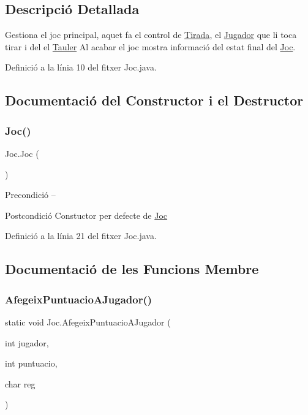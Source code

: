 \subsection{Descripció Detallada}
Gestiona el joc principal, aquet fa el control de \mbox{\hyperlink{class_tirada}{Tirada}}, el \mbox{\hyperlink{class_jugador}{Jugador}} que li toca tirar i del el \mbox{\hyperlink{class_tauler}{Tauler}} Al acabar el joc mostra informació del estat final del \mbox{\hyperlink{class_joc}{Joc}}. 

Definició a la línia 10 del fitxer Joc.\+java.



\subsection{Documentació del Constructor i el Destructor}
\mbox{\label{class_joc_a22b2f8a3a689e97aa5245060187504e7}} 
\subsubsection{\texorpdfstring{Joc()}{Joc()}}
{\footnotesize\ttfamily Joc.\+Joc (\begin{DoxyParamCaption}{ }\end{DoxyParamCaption})}

\begin{DoxyPrecond}{Precondició}
-- 
\end{DoxyPrecond}
\begin{DoxyPostcond}{Postcondició}
Constuctor per defecte de \mbox{\hyperlink{class_joc}{Joc}} 
\end{DoxyPostcond}


Definició a la línia 21 del fitxer Joc.\+java.



\subsection{Documentació de les Funcions Membre}
\mbox{\label{class_joc_ae969b3e16360a36ada26dffbb184fc33}} 
\subsubsection{\texorpdfstring{Afegeix\+Puntuacio\+A\+Jugador()}{AfegeixPuntuacioAJugador()}}
{\footnotesize\ttfamily static void Joc.\+Afegeix\+Puntuacio\+A\+Jugador (\begin{DoxyParamCaption}\item[{int}]{jugador,  }\item[{int}]{puntuacio,  }\item[{char}]{reg }\end{DoxyParamCaption})\hspace{0.3cm}{\ttfamily [static]}}

